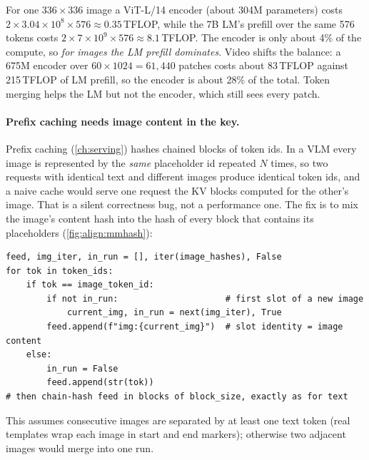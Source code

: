 \begin{napkinmath}
For one $336\times336$ image a ViT-L/14 encoder (about 304M parameters) costs
$2\times3.04\times10^8\times576\approx0.35$\,TFLOP, while the 7B LM's prefill over the same 576 tokens costs
$2\times7\times10^9\times576\approx8.1$\,TFLOP. The encoder is only about 4\% of the compute, so
\emph{for images the LM prefill dominates}. Video shifts the balance: a 675M encoder over
$60\times1024=61{,}440$ patches costs about 83\,TFLOP against 215\,TFLOP of LM prefill, so the encoder is about 28\% of the total.
Token merging helps the LM but not the encoder, which still sees every patch.
\end{napkinmath}

\paragraph{Prefix caching needs image content in the key.} Prefix caching (\cref{ch:serving})
hashes chained blocks of token ids. In a VLM every image is represented by the \emph{same}
placeholder id repeated $N$ times, so two requests with identical text and different images
produce identical token ids, and a naive cache would serve one request the KV blocks computed
for the other's image. That is a silent correctness bug, not a performance one. The fix is to mix
the image's content hash into the hash of every block that contains its placeholders
(\cref{fig:align:mmhash}):

\begin{lstlisting}[caption={Block hashes that include image content (\code{llmsys.vlm.multimodal\_block\_hashes}).},label={lst:align:mmhash}]
feed, img_iter, in_run = [], iter(image_hashes), False
for tok in token_ids:
    if tok == image_token_id:
        if not in_run:                     # first slot of a new image
            current_img, in_run = next(img_iter), True
        feed.append(f"img:{current_img}")  # slot identity = image content
    else:
        in_run = False
        feed.append(str(tok))
# then chain-hash feed in blocks of block_size, exactly as for text
\end{lstlisting}

This assumes consecutive images are separated by at least one text token (real templates wrap each
image in start and end markers); otherwise two adjacent images would merge into one run.

